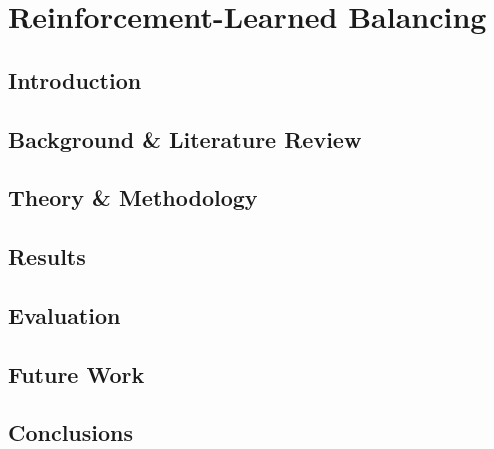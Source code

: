 \chapter{Reinforcement-Learned Balancing}
\label{chap:ns}

\section{Introduction}
\section{Background \& Literature Review}
\section{Theory \& Methodology}
\section{Results}
\section{Evaluation}
\section{Future Work}
\section{Conclusions}
